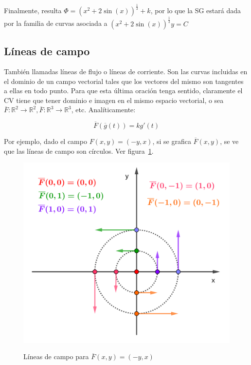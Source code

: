 \documentclass{article}
\renewcommand{\Bbb}{\mathbb}
\begin{document}
Finalmente, resulta $\Phi = (x^2 + 2 \sin(x))^{\frac{1}{2}} + k$, por lo que la SG estará dada por la familia de curvas asociada a $(x^2 + 2 \sin(x))^{\frac{1}{2}} y = C$

\subsection{Líneas de campo}

También llamadas líneas de flujo o líneas de corriente. Son las curvas incluidas en el dominio de un campo vectorial tales que los vectores del mismo son tangentes a ellas en todo punto. Para que esta última oración tenga sentido, claramente el CV tiene que tener dominio e imagen en el mismo espacio vectorial, o sea $\overline{F}: \Bbb R^2 \rightarrow \Bbb R^2, \overline{F}: \Bbb R^3 \rightarrow \Bbb R^3$, etc. Analíticamente:

\begin{equation}
\overline{F}(\overline{g}(t)) = k g'(t)
\end{equation}

Por ejemplo, dado el campo $F(x,y) = (-y,x)$, si se grafica $\overline{F}(x,y)$, se ve que las líneas de campo son círculos. Ver figura~\ref{fig:lincamp}.

\begin{figure}[ht]
\centering
\caption{Líneas de campo para $\overline{F}(x,y) = (-y,x)$}
\includegraphics[scale=0.7]{img/teo_fig036_lincamp.png}
\label{fig:lincamp}
\end{figure}
\end{document}

